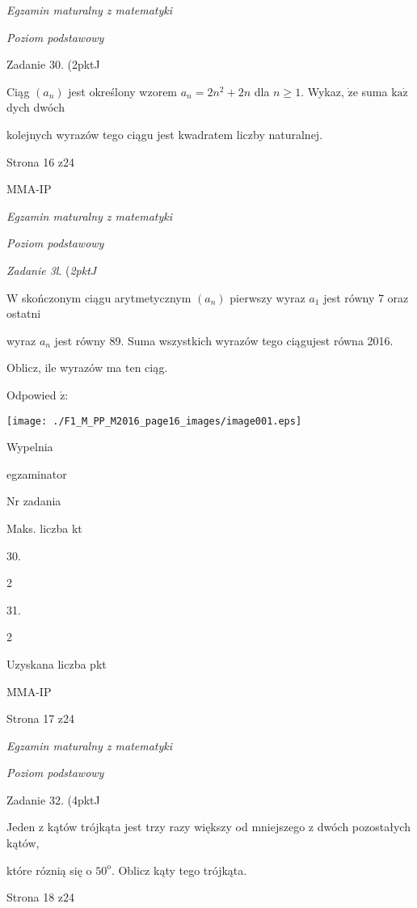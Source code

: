 \documentclass[a4paper,12pt]{article}
\begin{document}
{\it Egzamin maturalny z matematyki}

{\it Poziom podstawowy}

Zadanie 30. (2pktJ

Ciąg $(a_{n})$ jest określony wzorem $a_{n}=2n^{2}+2n$ dla $n\geq 1$. Wykaz, $\dot{\mathrm{z}}\mathrm{e}$ suma $\mathrm{k}\mathrm{a}\dot{\mathrm{z}}$ dych dwóch

kolejnych wyrazów tego ciągu jest kwadratem liczby naturalnej.

Strona 16 z24

MMA-IP





{\it Egzamin maturalny z matematyki}

{\it Poziom podstawowy}

{\it Zadanie 3l}. ({\it 2pktJ}

$\mathrm{W}$ skończonym ciągu arytmetycznym $(a_{n})$ pierwszy wyraz $a_{1}$ jest równy 7 oraz ostatni

wyraz $a_{n}$ jest równy 89. Suma wszystkich wyrazów tego ciągujest równa 2016.

Oblicz, ile wyrazów ma ten ciąg.

Odpowied $\acute{\mathrm{z}}$:
\begin{center}
\texttt{[image: ./F1\_M\_PP\_M2016\_page16\_images/image001.eps]}
\end{center}
Wypelnia

egzaminator

Nr zadania

Maks. liczba kt

30.

2

31.

2

Uzyskana liczba pkt

MMA-IP

Strona 17 z24





{\it Egzamin maturalny z matematyki}

{\it Poziom podstawowy}

Zadanie 32. (4pktJ

Jeden z kątów trójkąta jest trzy razy większy od mniejszego z dwóch pozostałych kątów,

które róznią się o $50^{\mathrm{o}}$. Oblicz kąty tego trójkąta.

Strona 18 z24
\end{document}
